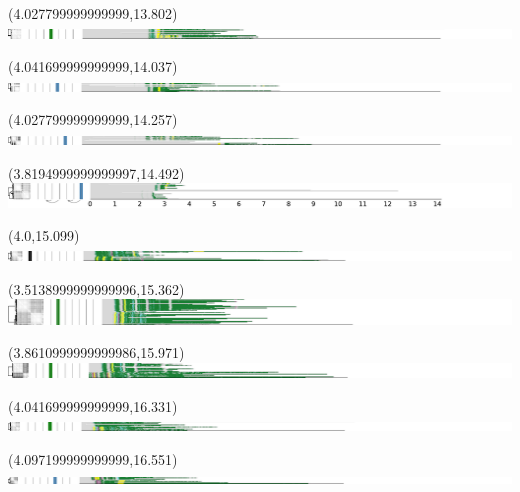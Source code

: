 \documentclass{article}
\begin{document}
\begin{textblock}{13}(4.027799999999999,13.802)\includegraphics{haplotypes-constrained/chr8-HG004.pdf}\end{textblock}
\begin{textblock}{13}(4.041699999999999,14.037)\includegraphics{haplotypes-constrained/chr8-HG005.pdf}\end{textblock}
\begin{textblock}{13}(4.027799999999999,14.257)\includegraphics{haplotypes-constrained/chr8-HG006.pdf}\end{textblock}
\begin{textblock}{13}(3.8194999999999997,14.492)\includegraphics{haplotypes-constrained/chr8-HG007.pdf}\end{textblock}
\begin{textblock}{13}(4.0,15.099)\includegraphics{haplotypes-constrained/chr11-HG001.pdf}\end{textblock}
\begin{textblock}{13}(3.5138999999999996,15.362)\includegraphics{haplotypes-constrained/chr11-HG002.pdf}\end{textblock}
\begin{textblock}{13}(3.8610999999999986,15.971)\includegraphics{haplotypes-constrained/chr11-HG003.pdf}\end{textblock}
\begin{textblock}{13}(4.041699999999999,16.331)\includegraphics{haplotypes-constrained/chr11-HG004.pdf}\end{textblock}
\begin{textblock}{13}(4.097199999999999,16.551)\includegraphics{haplotypes-constrained/chr11-HG005.pdf}\end{textblock}
\end{document}
